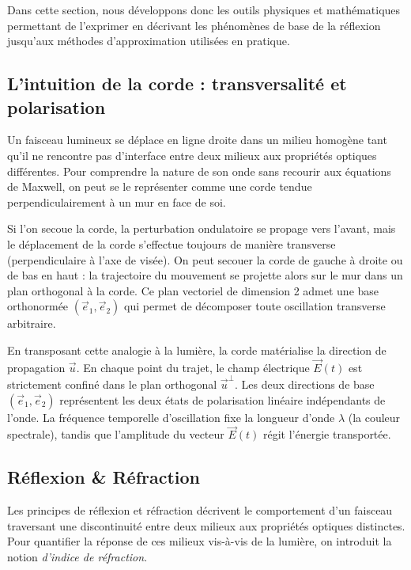 Dans cette section, nous développons donc les outils physiques et mathématiques permettant de l'exprimer en décrivant les phénomènes de base de la réflexion jusqu'aux méthodes d'approximation utilisées en pratique. 

\subsection{L'intuition de la corde : transversalité et polarisation}

Un faisceau lumineux se déplace en ligne droite dans un milieu homogène tant qu'il ne rencontre pas d'interface entre deux milieux aux propriétés optiques différentes. Pour comprendre la nature de son onde sans recourir aux équations de Maxwell, on peut se le représenter comme une corde tendue perpendiculairement à un mur en face de soi.



Si l'on secoue la corde, la perturbation ondulatoire se propage vers l'avant, mais le déplacement de la corde s'effectue toujours de manière transverse (perpendiculaire à l'axe de visée). On peut secouer la corde de gauche à droite ou de bas en haut : la trajectoire du mouvement se projette alors sur le mur dans un plan orthogonal à la corde. Ce plan vectoriel de dimension 2 admet une base orthonormée $(\vec{e}_1, \vec{e}_2)$ qui permet de décomposer toute oscillation transverse arbitraire.

En transposant cette analogie à la lumière, la corde matérialise la direction de propagation $\vec{u}$. En chaque point du trajet, le champ électrique $\vec{E}(t)$ est strictement confiné dans le plan orthogonal $\vec{u}^\perp$. Les deux directions de base $(\vec{e}_1, \vec{e}_2)$ représentent les deux états de polarisation linéaire indépendants de l'onde. La fréquence temporelle d'oscillation fixe la longueur d'onde $\lambda$ (la couleur spectrale), tandis que l'amplitude du vecteur $\vec{E}(t)$ régit l'énergie transportée.

\subsection{Réflexion \& Réfraction}

Les principes de réflexion et réfraction décrivent le comportement d'un faisceau traversant une discontinuité entre deux milieux aux propriétés optiques distinctes. Pour quantifier la réponse de ces milieux vis-à-vis de la lumière, on introduit la notion \emph{d'indice de réfraction}.

